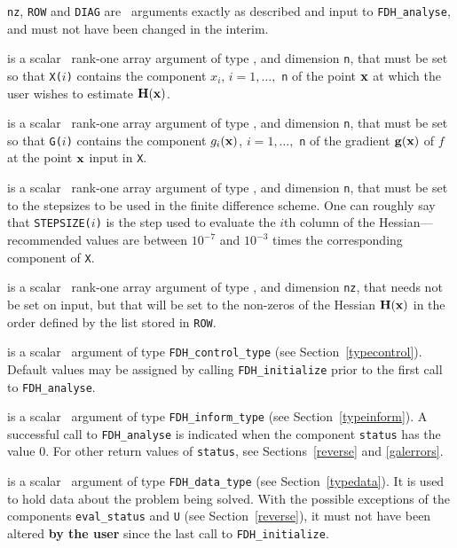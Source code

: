 \documentclass{galahad}
\newcommand{\packagename}{FDH}
\begin{document}
\vspace*{-2mm}
\begin{description}
 {\tt nz}, {\tt ROW} and {\tt DIAG} are  \intentin\ arguments 
exactly as described and input to {\tt \packagename\_analyse},
and must not have been changed in the interim.

 is a scalar \intentin\ rank-one array argument of type 
\realdp, and dimension {\tt n}, that  must be set so that
{\tt X(}$i${\tt)} contains the component $x_i$, $i = 1, \ldots,$ {\tt n} 
of the point ${\mathbf{x}}$ at which the user wishes to estimate ${\mathbf{H}}({\mathbf{x}})$.

 is a scalar \intentin\ rank-one array argument of type 
\realdp, and dimension {\tt n}, that must be set so that
{\tt G(}$i${\tt)} contains the component $g_i({\mathbf{x}})$, $i = 1, \ldots,$ {\tt n} 
of the gradient ${\mathbf{g}}({\mathbf{x}})$ of $f$ at the point ${\mathbf{x}}$ input in {\tt X}.

 is a scalar \intentin\ rank-one array argument of type 
\realdp, and dimension {\tt n}, that must be set to the stepsizes
to be used in the finite difference scheme.  One can roughly say that 
{\tt STEPSIZE(}$i${\tt)} is the step used to evaluate the $i$th column 
of the Hessian---recommended values are between $10^{-7}$ and $10^{-3}$
times the corresponding  component of {\tt X}.

 is a scalar \intentinout\ rank-one array argument of type 
\realdp, and dimension {\tt nz}, that needs not be set on input,
but that will be set to the non-zeros of the Hessian ${\mathbf{H}}({\mathbf{x}})$ in the
order defined by the list stored in {\tt ROW}.

 is a scalar \intentin\ argument of type 
{\tt \packagename\_control\_type}
(see Section~\ref{typecontrol}). Default values may be assigned by calling 
{\tt \packagename\_initialize} prior to the first call to 
{\tt \packagename\_analyse}. 

 is a scalar \intentinout\ argument of type 
{\tt \packagename\_inform\_type}
(see Section~\ref{typeinform}). 
A successful call to
{\tt \packagename\_analyse}
is indicated when the  component {\tt status} has the value 0. 
For other return values of {\tt status}, see Sections~\ref{reverse} and
\ref{galerrors}.

 is a scalar \intentinout\ argument of type 
{\tt \packagename\_data\_type}
(see Section~\ref{typedata}). It is used to hold data about the problem being 
solved. With the possible exceptions of the components 
{\tt eval\_status} and {\tt U} (see Section~\ref{reverse}), 
it must not have been altered {\bf by the user} since the last call to 
{\tt \packagename\_initialize}.


\end{description}
\end{document}
